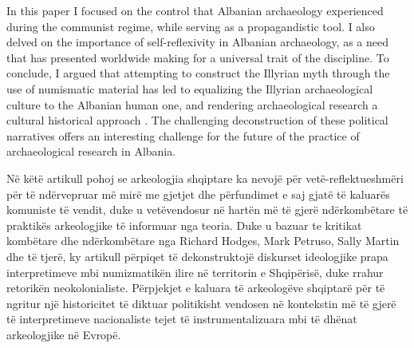 	In this paper I focused on the control that Albanian archaeology experienced during the communist regime, while serving as a propagandistic tool. I also delved on the importance of self-reflexivity in Albanian archaeology, as a need that has presented worldwide making for a universal trait of the discipline. To conclude, I argued that attempting to construct the Illyrian myth through the use of numismatic material has led to equalizing the Illyrian archaeological culture to the Albanian human one, and rendering archaeological research a cultural historical approach \parencite[18]{Johnson2010}. The challenging deconstruction of these political narratives offers an interesting challenge for the future of the practice of archaeological research in Albania.	
\myseparator
\begin{myabstract}  
			Në këtë artikull pohoj se arkeologjia shqiptare ka nevojë për vetë-reflektueshmëri për të ndërve\-pruar më mirë me gjetjet dhe përfundimet e saj gjatë të kaluarës komuniste të vendit, duke u vetëvendosur në hartën më të gjerë ndërkombëtare të praktikës arkeologjike të informuar nga teoria. Duke u bazuar te kritikat kombëtare dhe ndërkombëtare nga Richard Hodges, Mark Petruso, Sally Martin dhe të tjerë, ky artikull përpiqet të dekonstruktojë diskurset ideologjike prapa interpretimeve mbi numizmatikën ilire në territorin e Shqipërisë, duke rrahur retorikën neokolonialiste. Përpjekjet e kaluara të arkeologëve shqiptarë për të ngritur një historicitet të diktuar politikisht vendosen në kontekstin më të gjerë të interpretimeve nacionaliste tejet të instrumentalizuara mbi të dhënat arkeologjike në Evropë.
			
				
	\end{myabstract}


\printbibliography[heading=subbibnumbered] 
\label{bekteshi:lastpage}
\closingarticle
